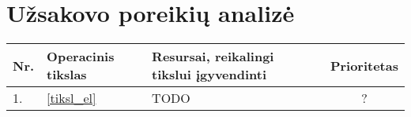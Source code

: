 \chapter{Užsakovo poreikių analizė}


\begin{tabular}[]{| l | p{1.6cm} | p{5.8cm} | c |}
  \hline
  Nr. & Operacinis tikslas & Resursai, reikalingi tikslui įgyvendinti &
  Prioritetas \\
  \hline
  1. & \ref{tiksl_el} & TODO & ? \\
  \hline
\end{tabular}

